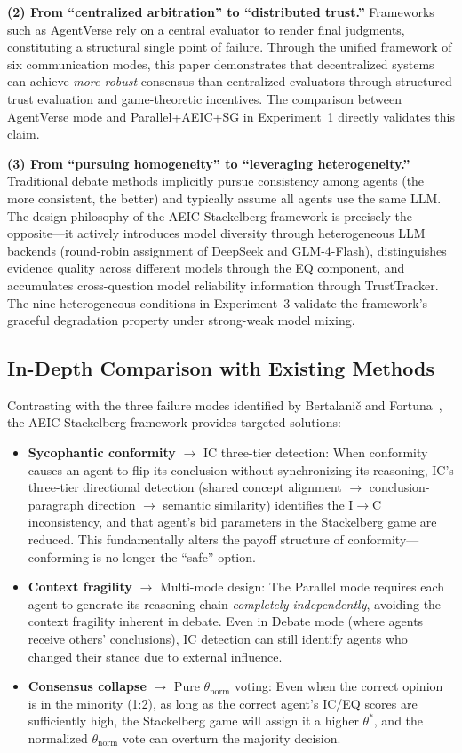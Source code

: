 \documentclass[12pt,a4paper]{article}
\begin{document}
\textbf{(2) From ``centralized arbitration'' to ``distributed trust.''} Frameworks such as AgentVerse rely on a central evaluator to render final judgments, constituting a structural single point of failure. Through the unified framework of six communication modes, this paper demonstrates that decentralized systems can achieve \textit{more robust} consensus than centralized evaluators through structured trust evaluation and game-theoretic incentives. The comparison between AgentVerse mode and Parallel+AEIC+SG in Experiment~1 directly validates this claim.

\textbf{(3) From ``pursuing homogeneity'' to ``leveraging heterogeneity.''} Traditional debate methods implicitly pursue consistency among agents (the more consistent, the better) and typically assume all agents use the same LLM. The design philosophy of the AEIC-Stackelberg framework is precisely the opposite---it actively introduces model diversity through heterogeneous LLM backends (round-robin assignment of DeepSeek and GLM-4-Flash), distinguishes evidence quality across different models through the EQ component, and accumulates cross-question model reliability information through TrustTracker. The nine heterogeneous conditions in Experiment~3 validate the framework's graceful degradation property under strong-weak model mixing.

\subsection{In-Depth Comparison with Existing Methods}

Contrasting with the three failure modes identified by Bertalani\v{c} and Fortuna~\cite{bertalanic2026cost}, the AEIC-Stackelberg framework provides targeted solutions:

\begin{itemize}[nosep]
    \item \textbf{Sycophantic conformity} $\to$ IC three-tier detection: When conformity causes an agent to flip its conclusion without synchronizing its reasoning, IC's three-tier directional detection (shared concept alignment $\to$ conclusion-paragraph direction $\to$ semantic similarity) identifies the I$\to$C inconsistency, and that agent's bid parameters in the Stackelberg game are reduced. This fundamentally alters the payoff structure of conformity---conforming is no longer the ``safe'' option.
    \item \textbf{Context fragility} $\to$ Multi-mode design: The Parallel mode requires each agent to generate its reasoning chain \textit{completely independently}, avoiding the context fragility inherent in debate. Even in Debate mode (where agents receive others' conclusions), IC detection can still identify agents who changed their stance due to external influence.
    \item \textbf{Consensus collapse} $\to$ Pure $\theta_{\text{norm}}$ voting: Even when the correct opinion is in the minority (1:2), as long as the correct agent's IC/EQ scores are sufficiently high, the Stackelberg game will assign it a higher $\theta^*$, and the normalized $\theta_{\text{norm}}$ vote can overturn the majority decision.
\end{itemize}
\end{document}
